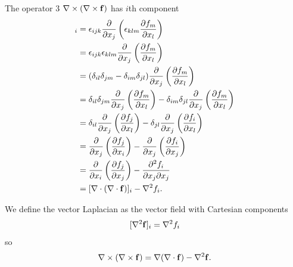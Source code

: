 \documentclass[10pt, a4paper]{article}
\begin{document}
The operator $3$ $\mathbf{\nabla} \times (\mathbf{\nabla} \times \mathbf{f})$ has $i$th component
\begin{align*}
    [\bnabla \times (\bnabla \times \vec{f})]_i &= \epsilon_{ijk}\pd{x_j}\left(\epsilon_{klm}\pd[f_m]{x_l}\right) \\
    &= \epsilon_{ijk}\epsilon_{klm}\pd{x_j}\left(\pd[f_m]{x_l}\right) \\
    &= (\delta_{il}\delta_{jm} - \delta_{im}\delta_{jl})\pd{x_j}\left(\pd[f_m]{x_l}\right) \\
    &= \delta_{il}\delta_{jm}\pd{x_j}\left(\pd[f_m]{x_l}\right) - \delta_{im}\delta_{jl}\pd{x_j}\left(\pd[f_m]{x_l}\right) \\
    &= \delta_{il}\pd{x_j}\left(\pd[f_j]{x_l}\right) - \delta_{jl}\pd{x_j}\left(\pd[f_i]{x_l}\right) \\
    &= \pd{x_j}\left(\pd[f_j]{x_i}\right) - \pd{x_j}\left(\pd[f_i]{x_j}\right) \\
    &= \pd{x_i}\left(\pd[f_j]{x_j}\right) - \frac{\partial ^ 2f_i}{\partial x_j\partial x_j} \\
    &= [\bnabla \cdot(\bnabla \cdot \vec{f})]_i - \nabla ^ 2f_i.
\end{align*}

We define the vector Laplacian as the vector field with Cartesian components
\[
[\mathbf{\nabla} ^ 2\mathbf{f}]_i = \nabla ^ 2f_i
\]
so
\[
\mathbf{\nabla} \times (\mathbf{\nabla} \times \mathbf{f}) = \mathbf{\nabla}(\mathbf{\nabla} \cdot \mathbf{f}) - \mathbf{\nabla} ^ 2\mathbf{f}.
\]
\end{document}
